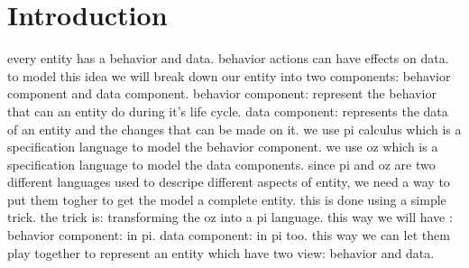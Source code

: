 \chapter{Introduction}
\pagestyle{scrheadings}	
\setcounter{page}{0}
\label{sec_introduction}
every entity has a behavior and data. behavior actions can have effects on data. to model this idea we will break down our entity into two components: behavior component and data component.
behavior component: represent the behavior that can an entity do during it's life cycle.
data component: represents the data of an entity and the changes that can be made on it.
we use pi calculus which is a specification language to model the behavior component.
we use oz which is a specification language to model the data components.
since pi and oz are two different languages used to descripe different aspects of entity, we need a way to put them togher to get the model a complete entity.
this is done using a simple trick. the trick is: transforming the oz into a pi language. this way we will have :
behavior component: in pi.
data component: in pi too.
this way we can let them play together to represent an entity which have two view: behavior and data.



